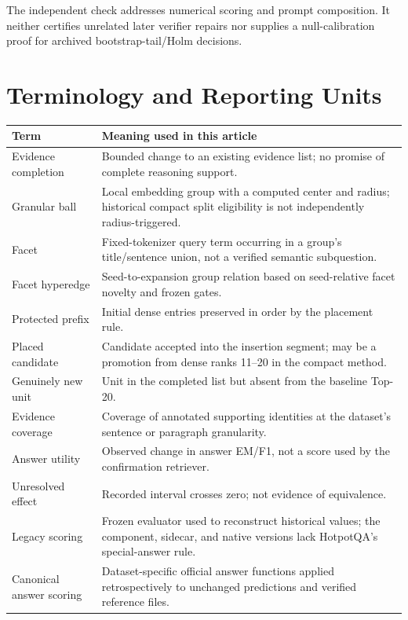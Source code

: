 \documentclass[11pt,a4paper]{article}
\begin{document}
The independent check addresses numerical scoring and prompt composition.
It neither certifies unrelated later verifier repairs nor supplies a
null-calibration proof for archived bootstrap-tail/Holm decisions.

\section{Terminology and Reporting Units}
\begin{longtable}{@{}p{}p{}@{}}
\toprule
Term & Meaning used in this article\\
\midrule
\endhead
Evidence completion & Bounded change to an existing evidence list; no promise
of complete reasoning support.\\
Granular ball & Local embedding group with a computed center and radius;
historical compact split eligibility is not independently radius-triggered.\\
Facet & Fixed-tokenizer query term occurring in a group's title/sentence union,
not a verified semantic subquestion.\\
Facet hyperedge & Seed-to-expansion group relation based on seed-relative
facet novelty and frozen gates.\\
Protected prefix & Initial dense entries preserved in order by the placement rule.\\
Placed candidate & Candidate accepted into the insertion segment; may be a
promotion from dense ranks 11--20 in the compact method.\\
Genuinely new unit & Unit in the completed list but absent from the baseline Top-20.\\
Evidence coverage & Coverage of annotated supporting identities at the
dataset's sentence or paragraph granularity.\\
Answer utility & Observed change in answer EM/F1, not a score used by the
confirmation retriever.\\
Unresolved effect & Recorded interval crosses zero; not evidence of equivalence.\\
Legacy scoring & Frozen evaluator used to reconstruct historical values;
the component, sidecar, and native versions lack HotpotQA's special-answer rule.\\
Canonical answer scoring & Dataset-specific official answer functions applied
retrospectively to unchanged predictions and verified reference files.\\
\bottomrule
\end{longtable}
\end{document}
